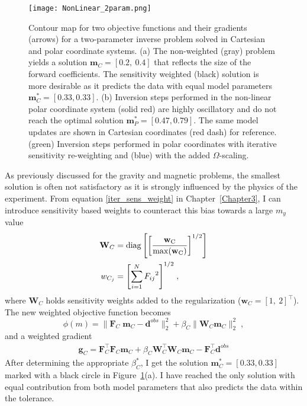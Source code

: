\begin{figure}{\centering
\texttt{[image: NonLinear\_2param.png]}}
\caption{Contour map for two objective functions and their gradients (arrows) for a two-parameter inverse problem solved in Cartesian and polar coordinate systems. (a) The non-weighted (gray) problem yields a solution $\mathbf{m}_C=[0.2,\:0.4]$ that reflects the size of the forward coefficients. The sensitivity weighted (black) solution is more desirable as it predicts the data with equal model parameters $\mathbf{m}^*_C=[0.33, 0.33]$. (b) Inversion steps performed in the non-linear polar coordinate system (solid red) are highly oscillatory and do not reach the optimal solution $\mathbf{m}_P^*=[0.47, 0.79]$. The same model updates are shown in Cartesian coordinates (red dash) for reference. (green) Inversion steps performed in polar coordinates with iterative sensitivity re-weighting and (blue) with the added $\Omega$-scaling.}
\label{NonLinearGN}
\end{figure}

As previously discussed for the gravity and magnetic problems, the smallest solution is often not satisfactory as it is strongly influenced by the physics of the experiment.
From equation \eqref{iter_sens_weight} in Chapter~\ref{Chapter3}, I can introduce sensitivity based weights to counteract this bias towards a large $m_y$ value
\begin{equation}
\begin{split}
\mathbf{W}_C &= \rm{diag} \left[ {\left[\frac{\mathbf{ w}_C}{\rm{max}(\mathbf{ w}_C)}\right]}^{1/2}\right]\\
w_{C_j} &= {\left[\sum_{i=1}^{N}{F_{ij}}^2 \right]}^{1/2}\;,
\end{split}
\end{equation}
where $\mathbf{W}_C$ holds sensitivity weights added to the regularization ($\mathbf{w}_C=[1,\:2]^\top$).
The new weighted objective function becomes
\begin{equation}\label{toyProblem}
\phi(m) = \| \mathbf{F}_C\;\mathbf{m}_C - \mathbf{d}^{obs} \|_2^2 + \beta_C \| \mathbf{W}_C \mathbf{m}_C \|_2^2 \;,
\end{equation}
and a weighted gradient
\begin{equation}\label{gradLinearWeighted}
\begin{split}
\mathbf{g}_C = \mathbf{F}_C^\top\mathbf{F}_C \mathbf{m}_C + \beta_C \mathbf{W}_C^\top\mathbf{W}_C\mathbf{m}_C - \mathbf{F}_C^\top \mathbf{d}^{obs}
\end{split}
\end{equation}
After determining the appropriate $\beta_C^*$, I get the solution $\mathbf{m}^*_C=[0.33, 0.33]$ marked with a black circle in Figure~\ref{NonLinearGN}(a). I have reached the only solution with equal contribution from both model parameters that also predicts the data within the tolerance.

